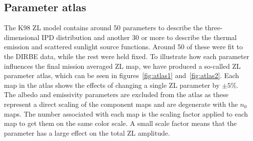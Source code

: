 \documentclass{aa}
\begin{document}
\subsection{Parameter atlas}
The K98 ZL model contains around 50 parameters to describe the 
three-dimensional IPD distribution and another 30 or more to describe 
the thermal emission and scattered sunlight source functions. Around 50 
of these were fit to the DIRBE data, while the rest were held fixed. To 
illustrate how each parameter influences the final mission averaged ZL 
map, we have produced a so-called ZL parameter atlas, which can be seen 
in figures~\ref{fig:atlas1} and~\ref{fig:atlas2}. Each map in the atlas 
shows the effects of changing a single ZL parameter by $\pm 5\%$. The 
albedo and emissivity parameters are excluded from the atlas as these 
represent a direct scaling of the component maps and are degenerate with 
the $n_0$ maps. The number associated with each map is the scaling 
factor applied to each map to get them on the same color scale. A small 
scale factor means that the parameter has a large effect on the total ZL 
amplitude.
\end{document}

